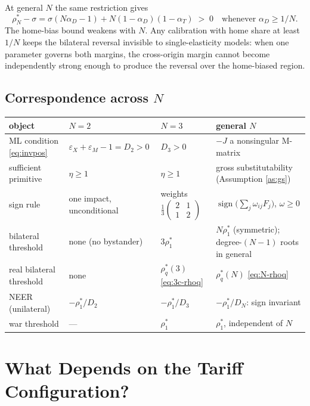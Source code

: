 \documentclass[11pt]{article}
\begin{document}
At general $N$ the same restriction gives
\begin{equation}
\rho_N^* - \sigma = \sigma(N\alpha_D - 1) + N(1-\alpha_D)(1-\alpha_T)
\;>\; 0 \quad \text{whenever } \alpha_D \geq 1/N .
\label{eq:N-gap}
\end{equation}
The home-bias bound weakens with $N$. Any calibration with home share at least $1/N$ keeps the bilateral reversal invisible to single-elasticity models: when one parameter governs both margins, the cross-origin margin cannot become independently strong enough to produce the reversal over the home-biased region.

\subsection{Correspondence across $N$}

\begin{center}
\begin{tabular}{p{3.6cm}p{3.0cm}p{3.4cm}p{4.2cm}}
\toprule
object & $N = 2$ & $N = 3$ & general $N$ \\
\midrule
ML condition \eqref{eq:invpos} & $\varepsilon_X + \varepsilon_M - 1 = D_2 > 0$ & $D_3 > 0$ & $-J$ a nonsingular M-matrix \\[3pt]
sufficient primitive & $\eta \geq 1$ & $\eta \geq 1$ & gross substitutability (Assumption \ref{as:gs}) \\[3pt]
sign rule & one impact, unconditional & weights $\tfrac{1}{3}\left(\begin{smallmatrix} 2 & 1 \\ 1 & 2\end{smallmatrix}\right)$ & $\operatorname{sign}\big(\sum_j \omega_{ij}F_j\big)$, $\omega \geq 0$ \\[3pt]
bilateral threshold & none (no bystander) & $3\rho_1^*$ & $N\rho_1^*$ (symmetric); degree-$(N-1)$ roots in general \\[3pt]
real bilateral threshold & none & $\rho_q^*(3)$ \eqref{eq:3c-rhoq} & $\rho_q^*(N)$ \eqref{eq:N-rhoq} \\[3pt]
NEER (unilateral) & $-\rho_1^*/D_2$ & $-\rho_1^*/D_3$ & $-\rho_1^*/D_N$: sign invariant \\[3pt]
war threshold & --- & $\rho_1^*$ & $\rho_1^*$, independent of $N$ \\
\bottomrule
\end{tabular}
\end{center}

\section{What Depends on the Tariff Configuration?}
\end{document}
